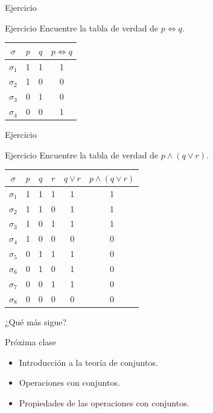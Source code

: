 \documentclass[dvisvgm,hypertex,aspectratio=169]{beamer}
\newenvironment{changemargin}{%
  \vspace*{-0.5cm}
  \begin{list}{}{%
    \setlength{\leftmargin}{-1cm}%
    \setlength{\rightmargin}{0pt}%
  }%
  \item[]}{\end{list}}
\begin{document}
\begin{frame}{Ejercicio}
  \begin{block}{Ejercicio}
    Encuentre la tabla de verdad de $p\iff q$.

    \pause
    \begin{center}
      \begin{tabular}{ |c|c|c|c| }
        \hline
        $\sigma$ & $p$ & $q$ & $p\iff q$ \\
        \hline
        $\sigma_1$ & 1 & 1 & 1 \\
        $\sigma_2$ & 1 & 0 & 0 \\
        $\sigma_3$ & 0 & 1 & 0 \\
        $\sigma_4$ & 0 & 0 & 1 \\
        \hline
      \end{tabular}
    \end{center}
  \end{block}
\end{frame}
\begin{frame}{Ejercicio}
  \begin{block}{Ejercicio}
    Encuentre la tabla de verdad de $p\land(q\lor r)$.

    \pause
    \begin{center}
      \begin{tabular}{ |c|c|c|c|c|c| }
        \hline
        $\sigma$ & $p$ & $q$ & $r$ & $q\lor r$ & $p\land(q\lor r)$ \\
        \hline
        $\sigma_1$ & 1 & 1 & 1 & 1 & 1 \\
        $\sigma_2$ & 1 & 1 & 0 & 1 & 1 \\
        $\sigma_3$ & 1 & 0 & 1 & 1 & 1 \\
        $\sigma_4$ & 1 & 0 & 0 & 0 & 0 \\
        $\sigma_5$ & 0 & 1 & 1 & 1 & 0 \\
        $\sigma_6$ & 0 & 1 & 0 & 1 & 0 \\
        $\sigma_7$ & 0 & 0 & 1 & 1 & 0 \\
        $\sigma_8$ & 0 & 0 & 0 & 0 & 0 \\
        \hline
      \end{tabular}
    \end{center}
  \end{block}
\end{frame}
\begin{frame}{¿Qué más sigue?}
  \begin{block}{Próxima clase}
    \begin{itemize}
      \item Introducción a la teoría de conjuntos.
      \item Operaciones con conjuntos.
      \item Propiedades de las operaciones con conjuntos.
    \end{itemize}
  \end{block}
\end{frame}
\begin{frame}
  \begin{changemargin}
  \end{changemargin}
\end{frame}
\end{document}
